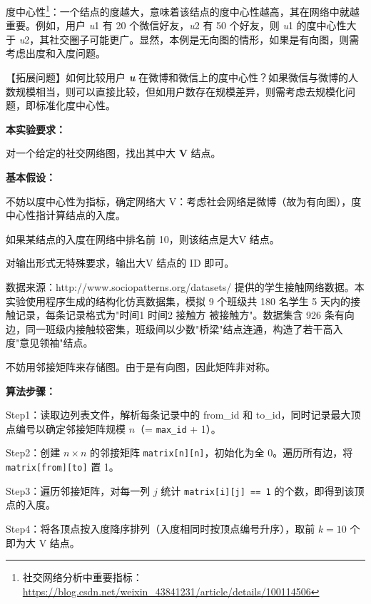 \noindent\hspace*{2em}度中心性\footnote{社交网络分析中重要指标：\url{https://blog.csdn.net/weixin_43841231/article/details/100114506}}：一个结点的度越大，意味着该结点的度中心性越高，其在网络中就越重要。例如，用户 \textit{u}1 有 20 个微信好友，\textit{u}2 有 50 个好友，则 \textit{u}1 的度中心性大于 \textit{u}2，其社交圈子可能更广。显然，本例是无向图的情形，如果是有向图，则需考虑出度和入度问题。\par
\noindent\hspace*{2em}【拓展问题】如何比较用户 \textit{\textbf{u}}\textit{\textbf{ }}在微博和微信上的度中心性？如果微信与微博的人数规模相当，则可以直接比较，但如用户数存在规模差异，则需考虑去规模化问题，即标准化度中心性。\par
\noindent\textbf{本实验要求：}\par
\noindent\hspace*{2em}对一个给定的社交网络图，找出其中大 \textbf{V}\textbf{ }结点。\par
{}
\noindent\textbf{基本假设：}\par
\noindent\hspace*{2em}不妨以度中心性为指标，确定网络大 V：考虑社会网络是微博（故为有向图），度中心性指计算结点的入度。\par
\noindent\hspace*{2em}如果某结点的入度在网络中排名前 10，则该结点是大V 结点。\par
\noindent\hspace*{2em}对输出形式无特殊要求，输出大V 结点的 ID 即可。\par
\noindent\hspace*{2em}数据来源：http://www.sociopatterns.org/datasets/ 提供的学生接触网络数据。本实验使用程序生成的结构化仿真数据集，模拟 9 个班级共 180 名学生 5 天内的接触记录，每条记录格式为"时间1 时间2 接触方 被接触方"。数据集含 926 条有向边，同一班级内接触较密集，班级间以少数"桥梁"结点连通，构造了若干高入度"意见领袖"结点。\par
\noindent\hspace*{2em}不妨用邻接矩阵来存储图。由于是有向图，因此矩阵非对称。\par

\noindent\textbf{算法步骤：}\par
\noindent\hspace*{2em}Step1：读取边列表文件，解析每条记录中的 from\_id 和 to\_id，同时记录最大顶点编号以确定邻接矩阵规模 $n$（= \texttt{max\_id} + 1）。\par
\noindent\hspace*{2em}Step2：创建 $n \times n$ 的邻接矩阵 \texttt{matrix[n][n]}，初始化为全 0。遍历所有边，将 \texttt{matrix[from][to]} 置 1。\par
\noindent\hspace*{2em}Step3：遍历邻接矩阵，对每一列 $j$ 统计 \texttt{matrix[i][j] == 1} 的个数，即得到该顶点的入度。\par
\noindent\hspace*{2em}Step4：将各顶点按入度降序排列（入度相同时按顶点编号升序），取前 $k = 10$ 个即为大 V 结点。\par

